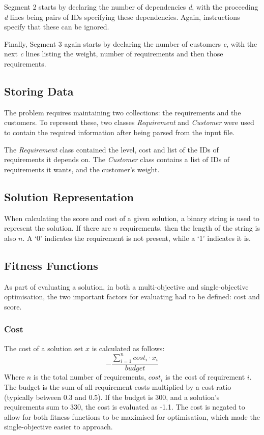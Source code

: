 \documentclass[11pt, a4paper]{article}
\begin{document}
Segment 2 starts by declaring the number of dependencies \emph{d}, with the
proceeding \emph{d} lines being pairs of IDs specifying these dependencies.
Again, instructions specify that these can be ignored.

Finally, Segment 3 again starts by declaring the number of customers \emph{c},
with the next \emph{c} lines listing the weight, number of requirements and then
those requirements.

\subsection{Storing Data} %
\label{sub:storing_data}
The problem requires maintaining two collections: the requirements and the
customers. To represent these, two classes \emph{Requirement} and
\emph{Customer} were used to contain the required information after being parsed
from the input file.

The \emph{Requirement} class contained the level, cost and list of the IDs of
requirements it depends on. The \emph{Customer} class contains a list of IDs of
requirements it wants, and the customer's weight.

\subsection{Solution Representation} %
\label{sub:Solution_representation}
When calculating the score and cost of a given solution, a binary string is used
to represent the solution. If there are \(n\) requirements, then the length of
the string is also \(n\). A `0' indicates the requirement is not present, while
a `1' indicates it is.

\subsection{Fitness Functions} %
\label{sub:fitness_functions}
As part of evaluating a solution, in both a multi-objective and single-objective
optimisation, the two important factors for evaluating had to be defined: cost
and score.

\subsubsection{Cost} %
\label{ssub:cost}
The cost of a solution set \(x\) is calculated as follows:
\[- \frac{\sum_{i=1}^{n} cost_i \cdot x_i}{budget} \]
Where \(n\) is the total number of requirements, \(cost_i\) is the cost of
requirement \(i\). The budget is the sum of all requirement costs multiplied by
a cost-ratio (typically between 0.3 and 0.5). If the budget is 300, and a
solution's requirements sum to 330, the cost is evaluated as -1.1. The cost is
negated to allow for both fitness functions to be maximised for optimisation,
which made the single-objective easier to approach.
\end{document}
